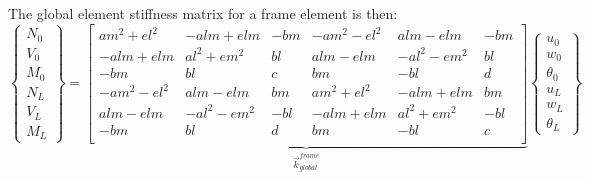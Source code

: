 \newpage



\begin{strip}
The global element stiffness matrix for a frame element is then:
	\begin{equation}
		\begin{Bmatrix}
			N_0\\ V_0\\ M_0\\ \hline N_L\\ V_L\\ M_L
		\end{Bmatrix}
	=
	\underbrace{
		\left[
		\begin{array}{c|cc|c|cc}
			am^2 + el^2&-alm + elm&-bm&-am^2 - el^2&alm - elm&-bm\\ \hline
			-alm + elm&al^2 + em^2&bl&alm - elm&-al^2 - em^2&bl\\
			-bm&bl&c&bm&-bl&d\\ \hline
			-am^2 - el^2&alm - elm&bm&am^2 + el^2&-alm + elm&bm\\ \hline
			alm - elm&-al^2 - em^2&-bl&-alm + elm&al^2 + em^2&-bl\\
			-bm&bl&d&bm&-bl&c\\
		\end{array}
		\right]
		}_{\displaystyle{\vec{k}_{global}^{frame}}}
		\begin{Bmatrix}
			u_0\\ w_0\\ \theta_0\\ \hline u_L\\ w_L\\ \theta_L
		\end{Bmatrix}
	\end{equation}
\end{strip}
